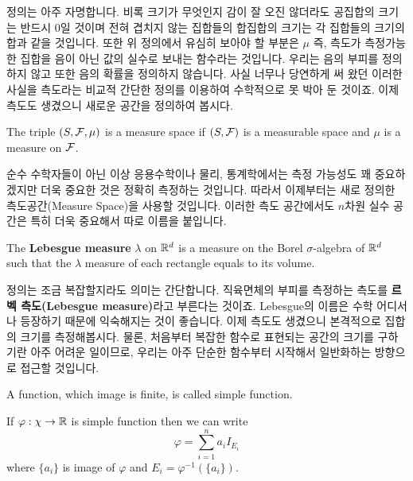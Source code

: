 \documentclass[final]{IEEEphot}
\begin{document}
정의는 아주 자명합니다. 비록 크기가 무엇인지 감이 잘 오진 않더라도 공집합의 크기는 반드시 0일 것이며 전혀 겹치지 않는 집합들의 합집합의 크기는 각 집합들의 크기의 합과 같을 것입니다. 또한 위 정의에서 유심히 보아야 할 부분은 $\mu$ 즉, 측도가 측정가능한 집합을 음이 아닌 값의 실수로 보내는 함수라는 것입니다. 우리는 음의 부피를 정의하지 않고 또한 음의 확률을 정의하지 않습니다. 사실 너무나 당연하게 써 왔던 이러한 사실을 측도라는 비교적 간단한 정의를 이용하여 수학적으로 못 박아 둔 것이죠.   이제 측도도 생겼으니 새로운 공간을 정의하여 봅시다.

\begin{definition}
 The triple $(S,\mathcal{F},\mu)$ is a measure space if $(S,\mathcal{F})$ is a measurable space and $\mu$ is a measure on $\mathcal{F}$.
 
 \HL
\end{definition}

순수 수학자들이 아닌 이상 응용수학이나 물리, 통계학에서는 측정 가능성도 꽤 중요하겠지만 더욱 중요한 것은 정확히 측정하는 것입니다. 따라서 이제부터는 새로 정의한 측도공간(Measure Space)을 사용할 것입니다. 이러한 측도 공간에서도 $n$차원 실수 공간은 특히 더욱 중요해서 따로 이름을 붙입니다.

\begin{definition}
 The \textbf{Lebesgue measure} $\lambda$ on $\mathbb{R}^d$ is a measure on the Borel $\sigma$-algebra of $\mathbb{R}^d$ such that the $\lambda$ measure of each rectangle equals to its volume.
 
 \HL
\end{definition}

정의는 조금 복잡할지라도 의미는 간단합니다. 직육면체의 부피를 측정하는 측도를 \textbf{르벡 측도(Lebesgue measure)}라고 부른다는 것이죠. Lebesgue의 이름은 수학 어디서나 등장하기 때문에 익숙해지는 것이 좋습니다.
이제 측도도 생겼으니 본격적으로 집합의 크기를 측정해봅시다. 물론, 처음부터 복잡한 함수로 표현되는 공간의 크기를 구하기란 아주 어려운 일이므로, 우리는 아주 단순한 함수부터 시작해서 일반화하는 방향으로 접근할 것입니다.

\newpage

\begin{definition}
	A function, which image is finite, is called simple function.
	
	\HL
\end{definition}

\begin{property}
	\label{prop:1}
	If $\varphi:\chi \rightarrow \mathbb{R}$ is simple function then we can write 
	$$\varphi = \sum_{i=1}^{n}a_iI_{E_i}$$ 
	where $\{a_i\}$ is image of $\varphi$ and $E_i = \varphi^{-1}(\{a_i\})$.
	
	\HL
\end{property}
\end{document}
